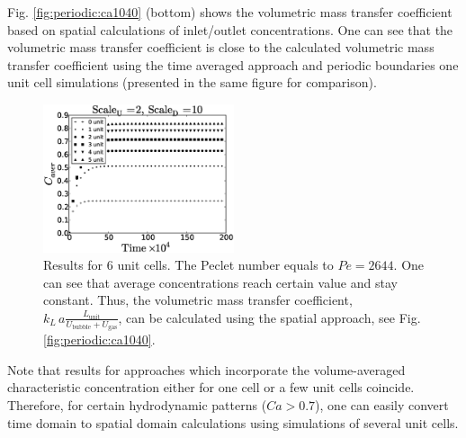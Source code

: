 \documentclass[preprint,12pt]{elsarticle}
\newcommand{\vol}{k_L\,a}
\newcommand{\lunit}{L_{\mathrm{unit}}}
\newcommand{\ububble}{U_{\mathrm{bubble}}}
\newcommand{\ugas}{U_{\mathrm{gas}}}
\newcommand{\volnondim}{\vol \frac{\lunit}{\ububble+\ugas}}
\begin{document}
Fig. \ref{fig:periodic:ca1040}
(bottom) shows the volumetric mass transfer coefficient based on spatial calculations of
inlet/outlet concentrations. One can see that the volumetric mass transfer coefficient is close to
the calculated volumetric mass transfer coefficient using the time averaged approach and periodic
boundaries one unit cell simulations (presented in the same figure for comparison).
\begin{figure}[htb!]
\begin{center}
\includegraphics[width=0.5\textwidth]{aver_units6scaleu2scaled5.eps}
\end{center}
\caption{Results for $6$ unit cells. The Peclet number equals to $Pe=2644$.
One can see that average concentrations reach certain value and stay constant.
Thus, the volumetric mass transfer coefficient, $\volnondim$, can be
calculated using the spatial approach, see Fig.
\ref{fig:periodic:ca1040}.
\label{fig:6:units:ca1040}}
\end{figure}
Note
that results for approaches which incorporate the volume-averaged characteristic concentration either for one cell or a few unit cells coincide. Therefore, for certain hydrodynamic patterns ($Ca>0.7$), one can
easily convert time domain to spatial domain calculations using simulations of several unit cells.
\end{document}
